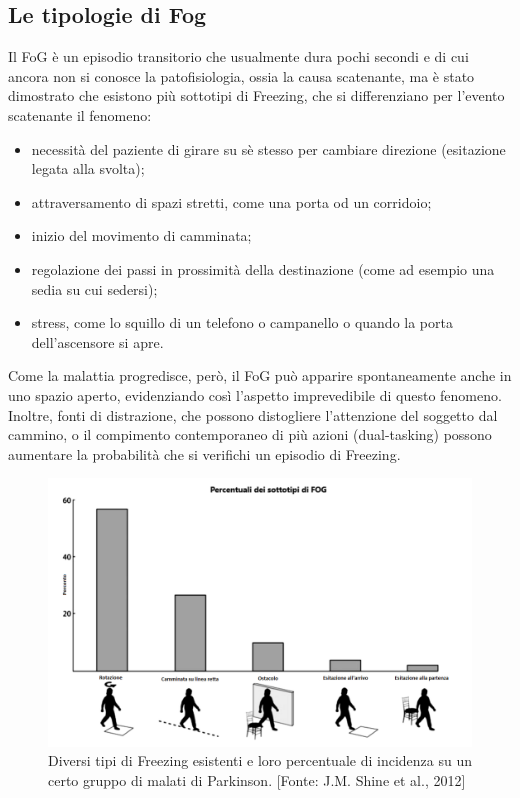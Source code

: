 \subsection{Le tipologie di Fog}
Il FoG è un episodio transitorio che usualmente dura pochi secondi e di cui ancora non si conosce la patofisiologia, ossia la causa scatenante, ma è stato dimostrato che esistono più sottotipi di Freezing, che si differenziano per l'evento scatenante il fenomeno:
\begin{itemize}
	\item necessità del paziente di girare su sè stesso per cambiare direzione (esitazione legata alla svolta);
	\item attraversamento di spazi stretti, come una porta od un corridoio;
	\item inizio del movimento di camminata;
	\item regolazione dei passi in prossimità della destinazione (come ad esempio una sedia su cui sedersi);
	\item stress, come lo squillo di un telefono o campanello o quando la porta dell'ascensore si apre.
\end{itemize}
Come la malattia progredisce, però, il FoG può apparire spontaneamente anche in uno spazio aperto, evidenziando così l’aspetto imprevedibile di questo fenomeno. Inoltre, fonti di distrazione, che possono distogliere l’attenzione del soggetto dal cammino, o il compimento contemporaneo di più azioni (dual-tasking) possono aumentare la probabilità che si verifichi un episodio di Freezing.\\
\begin{figure}[]
	\centering
	\includegraphics[width=1\textwidth]{images/Proportion_of_FOG_sub-types.png}
	\caption{Diversi tipi di Freezing esistenti e loro percentuale di incidenza su un certo gruppo di malati di Parkinson. [Fonte: J.M. Shine et al., 2012]}
\end{figure}
